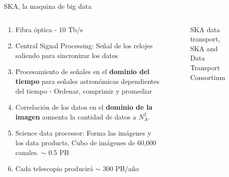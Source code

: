 \documentclass[xetex,aspectratio=169]{beamer}
\newcommand\Fontvi{\fontsize{10pt}{7.2}\selectfont}
\begin{document}
	\begin{frame}{SKA, la maquina de big data}
		\Fontvi
		\begin{columns}
			\begin{column}{0.48\textwidth}
				\begin{enumerate}
					\item Fibra óptica - 10 Tb/s
					\item Central Signal Processing: Señal de los relojes saliendo para sincronizar los datos
					\item Procesamiento de señales en el \textbf{dominio del tiempo} para señales astronómicas dependientes del tiempo - Ordenar, comprimir y promediar
					\item Correlación de los datos en el \textbf{dominio de la imagen} aumenta la cantidad de datos a $N_A^2$.
					\item Science data processor: Forma las imágenes y los data products. Cubo de imágenes de 60,000 canales. $\sim$ 0.5 PB
					\item Cada telescopio producirá $\sim$ 300 PB/año
				\end{enumerate}
			\end{column}
			\begin{column}{0.48\textwidth}
				\begin{figure}
					\centering
					\caption*{SKA data transport, SKA and Data Transport Consortium}
				\end{figure}
			\end{column}
		\end{columns}
	\end{frame}
\end{document}
